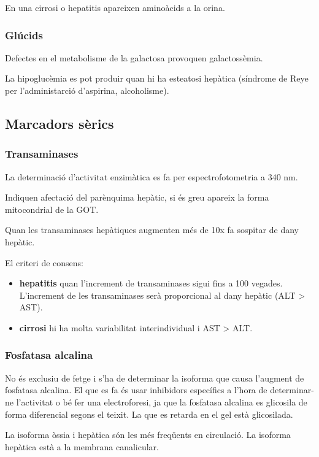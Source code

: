 En una cirrosi o hepatitis apareixen aminoàcids a la orina.

\subsubsection{Glúcids}
\label{sec:glucids}
Defectes en el metabolisme de la galactosa provoquen galactossèmia.

La hipoglucèmia es pot produir quan hi ha esteatosi hepàtica (síndrome
de Reye per l'administarció d'aspirina, alcoholisme).

\subsection{Marcadors sèrics}
\label{sec:marcadors-serics}

\subsubsection{Transaminases}
\label{sec:transaminases}
La determinació d'activitat enzimàtica es fa per espectrofotometria a
340 nm. 

Indiquen afectació del parènquima hepàtic, si és greu apareix la forma
mitocondrial de la GOT.

Quan les transaminases hepàtiques augmenten més de 10x fa sospitar de
dany hepàtic.

El criteri de consens:
\begin{itemize}
\item \textbf{hepatitis} quan l'increment de
transaminases sigui fins a 100 vegades. L'increment de les
transaminases serà proporcional al dany hepàtic (ALT > AST).

\item \textbf{cirrosi} hi ha molta variabilitat interindividual i AST > ALT.
\end{itemize}

\subsubsection{Fosfatasa alcalina}
\label{sec:fosfatasa-alcalina}
No és exclusiu de fetge i s'ha de determinar la isoforma que causa
l'augment de fosfatasa alcalina. El que es fa és usar inhibidors
específics a l'hora de determinar-ne l'activitat o bé fer una
electroforesi, ja que la fosfatasa alcalina es glicosila de forma
diferencial segons el teixit. La que es retarda en el gel està
glicosilada.

La isoforma òssia i hepàtica són les més freqüents en circulació. La
isoforma hepàtica està a la membrana canalicular. 


